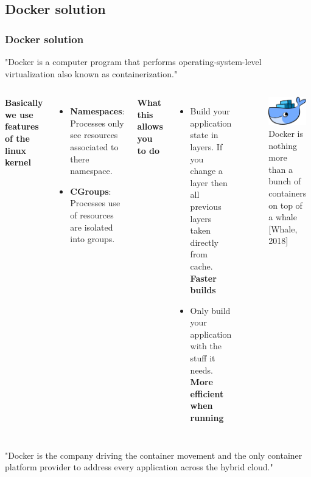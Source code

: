 \documentclass{beamer}
\begin{document}
\subsection{Docker solution} 
\begin{frame}
    \frametitle{Docker solution}
    \small
    "Docker is a computer program that performs operating-system-level virtualization also known as containerization." \tiny \cite{dockerwiki}
    \small
    \vspace{5mm}
    \begin{columns}
    \textbf{Basically we use features of the linux kernel \tiny \cite{dockeroverview}}
    \small
    \begin{itemize}
        \item \textbf{Namespaces}: Processes only see resources associated to there namespace.
        \item \textbf{CGroups}: Processes use of resources are isolated into groups.
    \end{itemize}
    \textbf{What this allows you to do}
    \begin{itemize}
        \item Build your application state in layers. If you change a layer then all previous layers taken directly from cache. \textbf{Faster builds}
        \item Only build your application with the stuff it needs. \textbf{More efficient when running \tiny \cite{justefficient}}
    \end{itemize}
    \begin{figure}
    \includegraphics[scale=0.3]{./pics/docker.png}
    \caption{\tiny Docker is nothing more than a bunch of containers on top of a whale [Whale, 2018]}
    \end{figure}
    \end{columns}
    \vspace{1mm}
\tiny
"Docker is the company driving the container movement and the only container platform provider to address every application across the hybrid cloud."\cite{whatisdocker}
\end{frame}
\end{document}
